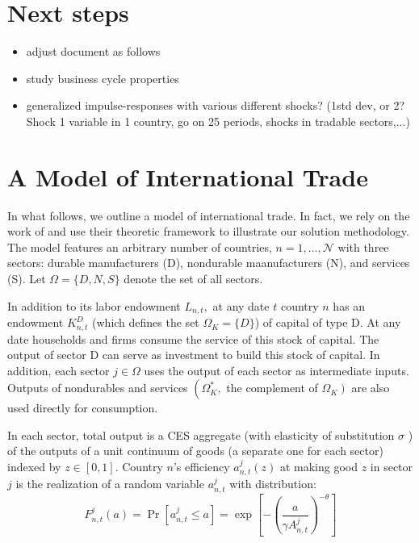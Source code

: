 \documentclass[12pt, bibtotoc, tablecaptionabove, figurecaptionabove, fleqn]{article}
\renewcommand{\baselinestretch}{1.5}
\begin{document}
\vspace{0.5cm}

\thispagestyle{empty}


\renewcommand{\baselinestretch}{1.5}

\newpage
\setcounter{page}{1}
\newpage
\setcounter{footnote}{0}
\renewcommand{\thefootnote}{\arabic{footnote} }

\section{Next steps}
\begin{itemize}
    \item adjust document as follows
    \item study business cycle properties
    \item generalized impulse-responses with various different shocks? (1std dev, or 2? Shock 1 variable in 1 country, go on 25 periods, shocks in tradable sectors,...)
\end{itemize}



\section{A Model of International Trade}
In what follows, we outline a model of international trade. In fact, we rely on the work of \cite{EKN2016} and use their theoretic framework to illustrate our solution methodology. The model features an arbitrary number of countries, $n=1, \ldots, \mathcal{N}$ with three sectors: durable manufacturers (D), nondurable maanufacturers (N), and services (S). Let $\Omega = \{D,N,S\}$ denote the set of all sectors. 

In addition to its labor endowment $L_{n, t},$ at any date $t$ country $n$ has an endowment $K_{n, t}^{D}$ (which defines the set $\Omega_{K} = \{D\}$) of capital of type D. At any date households and firms consume the service of this stock of capital. The output of sector D can serve as investment to build this stock of capital. In addition, each sector $j \in \Omega$ uses the output of each sector as intermediate inputs. Outputs of nondurables and services $\left(\Omega_{K}^{*},\right.$ the complement of $\left.\Omega_{K}\right)$ are also used directly for consumption.

In each sector, total output is a CES aggregate (with elasticity of substitution $\sigma$ ) of the outputs of a unit continuum of goods (a separate one for each sector) indexed by $z \in[0,1]$. Country $n$'s efficiency $a_{n, t}^{j}(z)$ at making good $z$ in sector $j$ is the realization of a random variable $a_{n, t}^{j}$ with
distribution:
\begin{equation*}
	F_{n, t}^{j}(a)=\operatorname{Pr}\left[a_{n, t}^{j} \leq a\right]=\exp \left[-\left(\frac{a}{\gamma A_{n, t}^{j}}\right)^{-\theta}\right]
\end{equation*}
\end{document}
